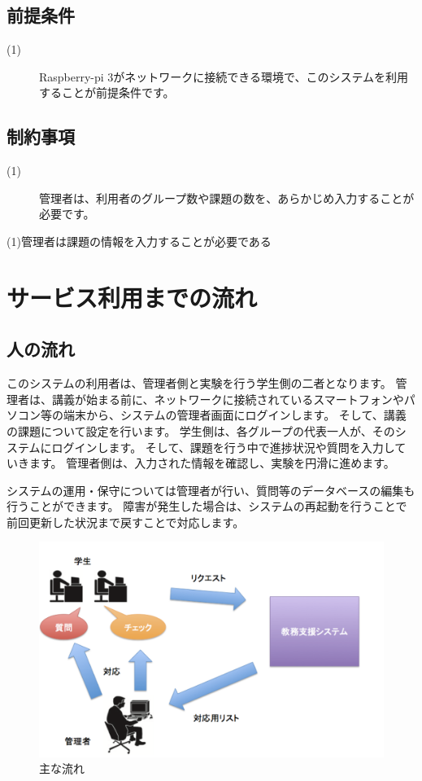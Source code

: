 \documentclass[a4j,titlepage]{ujarticle}
\begin{document}
\subsection{前提条件}
\begin{description}
\item[(1)]Raspberry-pi 3がネットワークに接続できる環境で、このシステムを利用することが前提条件です。
\end{description}

\subsection{制約事項}
\begin{description}
\item[(1)]管理者は、利用者のグループ数や課題の数を、あらかじめ入力することが必要です。
\end{description}

(1)管理者は課題の情報を入力することが必要である

\section{サービス利用までの流れ}
\subsection{人の流れ}
このシステムの利用者は、管理者側と実験を行う学生側の二者となります。
管理者は、講義が始まる前に、ネットワークに接続されているスマートフォンやパソコン等の端末から、システムの管理者画面にログインします。
そして、講義の課題について設定を行います。
学生側は、各グループの代表一人が、そのシステムにログインします。
そして、課題を行う中で進捗状況や質問を入力していきます。
管理者側は、入力された情報を確認し、実験を円滑に進めます。

システムの運用・保守については管理者が行い、質問等のデータベースの編集も行うことができます。
障害が発生した場合は、システムの再起動を行うことで前回更新した状況まで戻すことで対応します。 %
\begin{figure}[h]

\centering
   \includegraphics[width=13cm]{hito.png}
  \caption{主な流れ}
\end{figure}
\end{document}
